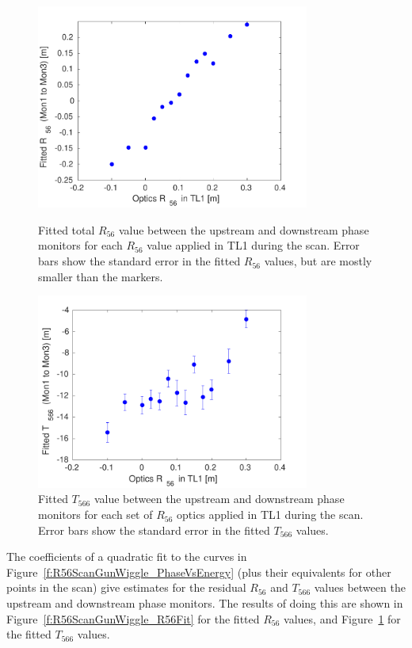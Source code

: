 \begin{figure}
  \centering
  \includegraphics[width=0.8\textwidth]{Figures/propagation/R56ScanGunWiggle_R56Fit}
  \caption{Fitted total \(R_{56}\) value between the upstream and downstream phase monitors for each \(R_{56}\) value applied in TL1 during the scan. Error bars show the standard error in the fitted \(R_{56}\) values, but are mostly smaller than the markers.}
  \label{f:R56ScanGunWiggle_R56Fit}
  \includegraphics[width=0.8\textwidth]{Figures/propagation/R56ScanGunWiggle_T566Fit}
  \caption{Fitted \(T_{566}\) value between the upstream and downstream phase monitors for each set of \(R_{56}\) optics applied in TL1 during the scan. Error bars show the standard error in the fitted \(T_{566}\) values.}
  \label{f:R56ScanGunWiggle_T566Fit}
\end{figure}

The coefficients of a quadratic fit to the curves in Figure~\ref{f:R56ScanGunWiggle_PhaseVsEnergy} (plus their equivalents for other points in the scan) give estimates for the residual \(R_{56}\) and \(T_{566}\) values between the upstream and downstream phase monitors. The results of doing this are shown in Figure~\ref{f:R56ScanGunWiggle_R56Fit} for the fitted \(R_{56}\) values, and Figure~\ref{f:R56ScanGunWiggle_T566Fit} for the fitted \(T_{566}\) values. 

